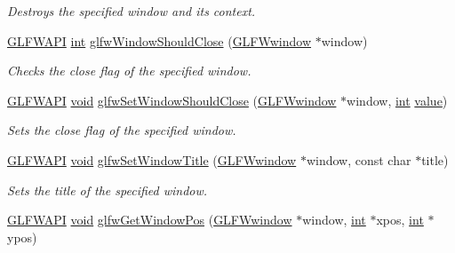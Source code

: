 \begin{DoxyCompactItemize}
\begin{DoxyCompactList}\small\item\em Destroys the specified window and its context. \end{DoxyCompactList}\item 
\hyperlink{glfw3_8h_a56da5036b2cc259351ae22fd6439bb47}{G\-L\-F\-W\-A\-P\-I} \hyperlink{wglew_8h_a500a82aecba06f4550f6849b8099ca21}{int} \hyperlink{group__window_gaa6162f67dfa38b8beda2fea623649332}{glfw\-Window\-Should\-Close} (\hyperlink{group__window_ga3c96d80d363e67d13a41b5d1821f3242}{G\-L\-F\-Wwindow} $\ast$window)
\begin{DoxyCompactList}\small\item\em Checks the close flag of the specified window. \end{DoxyCompactList}\item 
\hyperlink{glfw3_8h_a56da5036b2cc259351ae22fd6439bb47}{G\-L\-F\-W\-A\-P\-I} \hyperlink{wglew_8h_aeea6e3dfae3acf232096f57d2d57f084}{void} \hyperlink{group__window_ga1cadeda7a1e2f224e06a8415d30741aa}{glfw\-Set\-Window\-Should\-Close} (\hyperlink{group__window_ga3c96d80d363e67d13a41b5d1821f3242}{G\-L\-F\-Wwindow} $\ast$window, \hyperlink{wglew_8h_a500a82aecba06f4550f6849b8099ca21}{int} \hyperlink{glew_8h_a6a4f8a1a444e9080b297963b3db29fe0}{value})
\begin{DoxyCompactList}\small\item\em Sets the close flag of the specified window. \end{DoxyCompactList}\item 
\hyperlink{glfw3_8h_a56da5036b2cc259351ae22fd6439bb47}{G\-L\-F\-W\-A\-P\-I} \hyperlink{wglew_8h_aeea6e3dfae3acf232096f57d2d57f084}{void} \hyperlink{group__window_ga861ed3414ab8120e2f74151a666ed1dc}{glfw\-Set\-Window\-Title} (\hyperlink{group__window_ga3c96d80d363e67d13a41b5d1821f3242}{G\-L\-F\-Wwindow} $\ast$window, const char $\ast$title)
\begin{DoxyCompactList}\small\item\em Sets the title of the specified window. \end{DoxyCompactList}\item 
\hyperlink{glfw3_8h_a56da5036b2cc259351ae22fd6439bb47}{G\-L\-F\-W\-A\-P\-I} \hyperlink{wglew_8h_aeea6e3dfae3acf232096f57d2d57f084}{void} \hyperlink{group__window_ga0076a8591ef7494d359730cf2250b45b}{glfw\-Get\-Window\-Pos} (\hyperlink{group__window_ga3c96d80d363e67d13a41b5d1821f3242}{G\-L\-F\-Wwindow} $\ast$window, \hyperlink{wglew_8h_a500a82aecba06f4550f6849b8099ca21}{int} $\ast$xpos, \hyperlink{wglew_8h_a500a82aecba06f4550f6849b8099ca21}{int} $\ast$ypos)

\end{DoxyCompactItemize}
